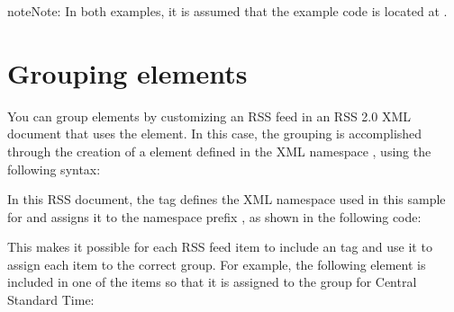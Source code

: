 \documentclass[letterpaper,12pt,english,openany,oneside]{sphinxmanual}
\begin{document}
\begin{sphinxadmonition}{note}{Note:}
In both examples, it is assumed that the example code is located at .
\end{sphinxadmonition}




\section{Grouping elements}
\label{\detokenize{Tracker_Examples:grouping-elements}}
You can group elements by customizing an RSS feed in an RSS 2.0 XML document that uses the  element. In this case, the grouping is accomplished through the creation of a  element defined in the XML namespace , using the following syntax:

\begin{sphinxVerbatim}[commandchars=\\\{\}]
\end{sphinxVerbatim}

In this RSS document, the  tag defines the XML namespace used in this sample for  and assigns it to the namespace prefix  , as shown in the following code:

\begin{sphinxVerbatim}[commandchars=\\\{\}]
  
\end{sphinxVerbatim}

This makes it possible for each RSS feed item to include an  tag and use it to assign each item to the correct group. For example, the following element is included in one of the items so that it is assigned to the group for Central Standard Time:
\end{document}
